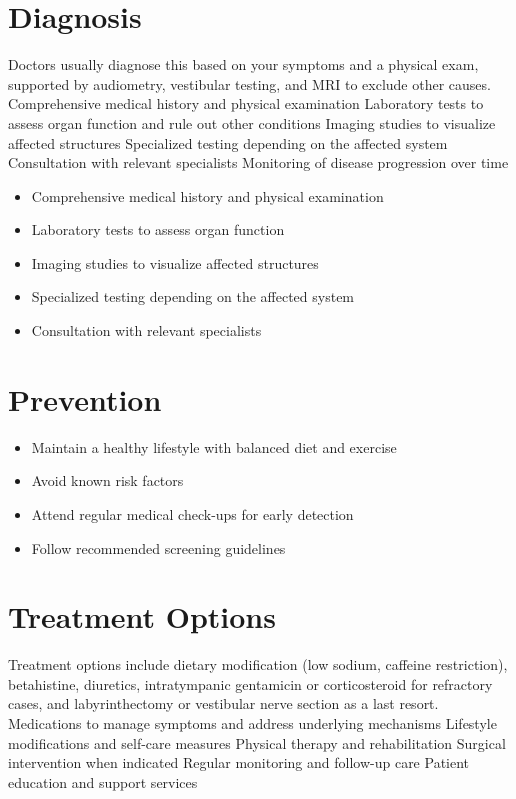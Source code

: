 \section{Diagnosis}
Doctors usually diagnose this based on your symptoms and a physical exam, supported by audiometry, vestibular testing, and MRI to exclude other causes. Comprehensive medical history and physical examination Laboratory tests to assess organ function and rule out other conditions Imaging studies to visualize affected structures Specialized testing depending on the affected system Consultation with relevant specialists Monitoring of disease progression over time

\begin{itemize}[noitemsep]
  \item Comprehensive medical history and physical examination
  \item Laboratory tests to assess organ function
  \item Imaging studies to visualize affected structures
  \item Specialized testing depending on the affected system
  \item Consultation with relevant specialists
\end{itemize}
\section{Prevention}
\begin{itemize}[noitemsep]
  \item Maintain a healthy lifestyle with balanced diet and exercise
  \item Avoid known risk factors
  \item Attend regular medical check-ups for early detection
  \item Follow recommended screening guidelines
\end{itemize}
\section{Treatment Options}
Treatment options include dietary modification (low sodium, caffeine restriction), betahistine, diuretics, intratympanic gentamicin or corticosteroid for refractory cases, and labyrinthectomy or vestibular nerve section as a last resort. Medications to manage symptoms and address underlying mechanisms Lifestyle modifications and self-care measures Physical therapy and rehabilitation Surgical intervention when indicated Regular monitoring and follow-up care Patient education and support services

